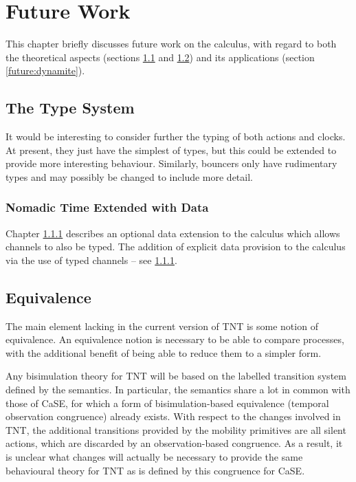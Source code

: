 \chapter{Future Work}
\label{futurework}

This chapter briefly discusses future work on the calculus, with regard
to both the theoretical aspects (sections \ref{future:types} and
\ref{future:equiv}) and its applications (section \ref{future:dynamite}).

\section{The Type System}
\label{future:types}

It would be interesting to consider further the
typing of both actions and clocks.  At present, they just have the
simplest of types, but this could be extended to provide more
interesting behaviour.  Similarly, bouncers only have rudimentary types
and may possibly be changed to include more detail.

\subsection{Nomadic Time Extended with Data}
\label{tnted}
Chapter \ref{tnted} describes an optional data extension to the
calculus which allows channels to also be typed.
The addition of explicit data provision to the calculus via the
  use of typed channels -- see \ref{tnted}.

\section{Equivalence}
\label{future:equiv}

The main element lacking in the current version of TNT is some notion of
equivalence.  An equivalence notion is necessary to be able to compare
processes, with the additional benefit of being able to reduce them to a
simpler form.

Any bisimulation theory for TNT will be based on the labelled transition
system defined by the semantics.  In particular, the semantics share a
lot in common with those of CaSE, for which a form of bisimulation-based
equivalence (temporal observation congruence) already exists.  With
respect to the changes involved in TNT, the additional transitions
provided by the mobility primitives are all silent actions, which are
discarded by an observation-based congruence.  As a result, it is
unclear what changes will actually be necessary to provide the same
behavioural theory for TNT as is defined by this congruence for CaSE.

